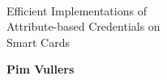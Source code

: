 \pagestyle{empty}

~\\

\vspace{2cm}

\begin{center}
\sffamily{}\selectfont\Huge
Efficient Implementations of\\
Attribute-based Credentials on\\
Smart Cards
\end{center}

\vspace{3cm}

\begin{center}
\textsf{\textbf{\Large Pim Vullers}}
\end{center}


